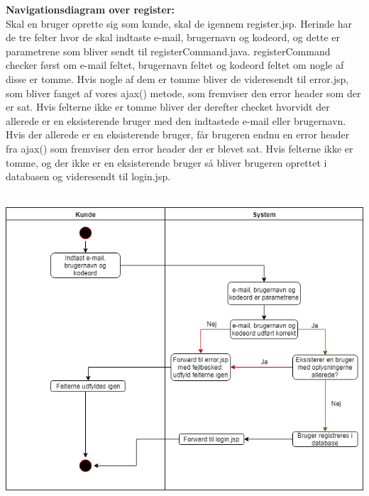 \documentclass[11pt]{report}
\begin{document}
\noindent
\textbf{Navigationsdiagram over register:}\\
Skal en bruger oprette sig som kunde, skal de igennem
register.jsp. Herinde har de tre felter hvor de skal indtaste e-mail,
brugernavn og kodeord, og dette er parametrene som bliver sendt til
registerCommand.java. registerCommand checker først om e-mail feltet,
brugernavn feltet og kodeord feltet om nogle af disse er tomme. Hvis
nogle af dem er tomme bliver de videresendt til error.jsp, som bliver
fanget af vores ajax() metode, som fremviser den error header som der
er sat. Hvis felterne ikke er tomme bliver der derefter checket
hvorvidt der allerede er en eksisterende bruger med den indtastede
e-mail eller brugernavn. Hvis der allerede er en eksisterende bruger,
får brugeren endnu en error header fra ajax() som fremviser den error
header der er blevet sat. Hvis felterne ikke er tomme, og der ikke er en eksisterende bruger så bliver brugeren oprettet i databasen og videresendt til login.jsp.\\\\ 
\begin{center}
\includegraphics[width=15cm]{RegisterCupCake.png}
\end{center}
\newpage
\end{document}

